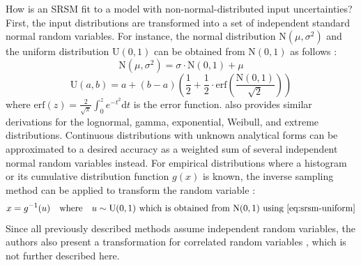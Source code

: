 \newpar How is an SRSM fit to a model with non-normal-distributed input uncertainties? First, the input distributions are transformed into a set of independent standard normal random variables. For instance, the normal distribution $\text{N}(\mu, \sigma^2)$ and the uniform distribution $\text{U}(0, 1)$ can be obtained from $\text{N}(0, 1)$ as follows \cite{srsm-phd-1999}:
\begin{equation*}
    \text{N}(\mu, \sigma^2) = \sigma \cdot \text{N}(0, 1) + \mu
\end{equation*}
\begin{equation} \label{eq:srsm-uniform}
    \text{U}(a, b) = a + (b-a) \left( \frac{1}{2} + \frac{1}{2} \cdot \text{erf}\left( \frac{\text{N}(0, 1)}{\sqrt{2}} \right) \right)
\end{equation}
where $\text{erf}(z) = \frac{2}{\sqrt{\pi}} \int_{0}^{z}{e^{-t^2} \text{d}t}$ is the error function. \citeauthor{srsm-phd-1999} also provides similar derivations for the lognormal, gamma, exponential, Weibull, and extreme distributions. Continuous distributions with unknown analytical forms can be approximated to a desired accuracy as a weighted sum of several independent normal random variables instead. For empirical distributions where a histogram or its cumulative distribution function $g(x)$ is known, the inverse sampling method can be applied to transform the random variable \cite[p.~28]{rv-generation-1986}:
\begin{equation*}
    x = g^{-1}(u) \quad \text{where} \quad u \sim \text{U}(0, 1) \text{ which is obtained from N}(0, 1) \text{ using \Cref{eq:srsm-uniform}}
\end{equation*}
Since all previously described methods assume independent random variables, the authors also present a transformation for correlated random variables \cite[pp.~42-43]{srsm-phd-1999}, which is not further described here.

